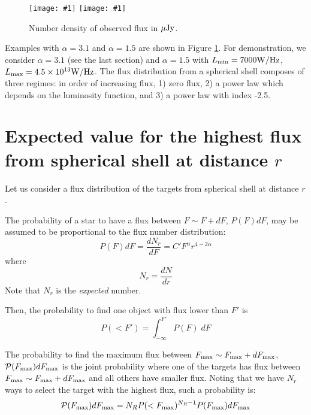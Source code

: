 \documentclass[iop,numberedappendix,apj,twocolappendix,]{emulateapj}
\def\plotoneh#1{\centering \leavevmode
\texttt{[image: \#1]}}
\begin{document}


\begin{figure}[htbp]
   \plotoneh{dndF_alpha31.pdf}
   \plotoneh{dndF_alpha15.pdf}
   \caption{Number density of observed flux in $\mu {\rm Jy}$.}
  \label{fig:dndF}
\end{figure}


Examples with $\alpha = 3.1$ and $\alpha = 1.5$ are shown in Figure \ref{fig:dndF}. For demonstration, we consider $\alpha = 3.1$ (see the last section) and $\alpha = 1.5$ with $L_{\rm min } = 7000 {\rm W/Hz}$, $L_{\rm max} = 4.5\times 10^{13} {\rm W/Hz}$. 
The flux distribution from a spherical shell composes of three regimes: in order of increasing flux, 1) zero flux, 2) a power law which depends on the luminosity function, and 3) a power law with index -2.5. 



\newpage

\section{Expected value for the highest flux from spherical shell at distance $r$}


Let us consider a flux distribution of the targets from spherical shell at distance $r$. 

The probability of a star to have a flux between $F\sim F+dF$, $P(F)dF $, may be assumed to be proportional to the flux number distribution:
\begin{equation}
P(F) dF = \frac{dN_r}{dF} = C' F^{\alpha } r^{4-2\alpha }
\end{equation}
where
\begin{equation}
N_r = \frac{dN}{dr} 
\end{equation}
Note that $N_r$ is the {\it expected} number. 

Then, the probability to find one object with flux lower than $F'$ is
\begin{equation}
P (<F') = \int _{-\infty} ^{F'}  P (F) \; dF 
\end{equation}

The probability to find the maximum flux between $F_{\rm max} \sim F_{\rm max} + dF_{\rm max}$, $\mathcal{P} (F_{\rm max}) dF_{\rm max}$ is the joint probability where one of the targets has flux between $F_{\rm max} \sim F_{\rm max} + dF_{\rm max}$ and all others have smaller flux. Noting that we have $N_r$ ways to select the target with the highest flux, such a probability is:
\begin{equation}
\mathcal{P} (F_{\rm max}) dF_{\rm max} = N_R P (< F_{\rm max})^{N_R-1}  P(F_{\rm max}) dF_{\rm max} %
\end{equation}
\end{document}

